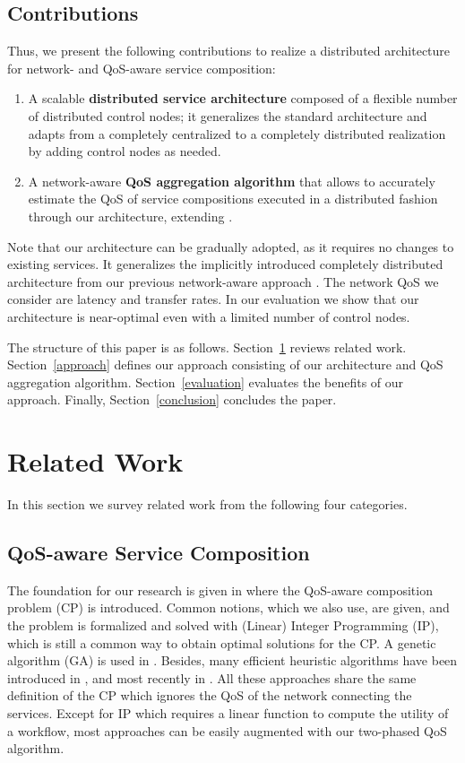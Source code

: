 \documentclass[10pt, conference, compsocconf]{IEEEtran}
\begin{document}
\subsection{Contributions}
\noindent Thus, we present the following contributions to realize a distributed architecture for network- and QoS-aware service composition:
\begin{enumerate}
	\item A scalable \textbf{distributed service architecture} composed of a flexible number of distributed control nodes;
			it generalizes the standard architecture and 
			adapts from a completely centralized to a completely distributed realization by adding control nodes as needed.
	\item A network-aware \textbf{QoS aggregation algorithm} that allows to accurately estimate the QoS of service compositions
		executed in a distributed fashion through our architecture,	extending \cite{Klein2012}.
\end{enumerate}
Note that our architecture can be gradually adopted, as it requires no changes to existing services.
It generalizes the implicitly introduced completely distributed architecture from our previous network-aware approach \cite{Klein2012}.
The network QoS we consider are latency and transfer rates.
In our evaluation we show that our architecture is near-optimal even with a limited number of control nodes.

The structure of this paper is as follows.
Section~\ref{related} reviews related work.
Section~\ref{approach} defines our approach consisting of our architecture and QoS aggregation algorithm.
Section~\ref{evaluation} evaluates the benefits of our approach.
Finally, Section~\ref{conclusion} concludes the paper.

\section{Related Work}
\label{related}
\noindent In this section we survey related work from the following four categories.

\subsection{QoS-aware Service Composition}
\noindent The foundation for our research is given in \cite{Zeng2003} where the QoS-aware composition problem (CP) is introduced.
Common notions, which we also use, are given, and the problem is formalized and solved with (Linear) Integer Programming (IP),
	which is still a common way to obtain optimal solutions for the CP.
A genetic algorithm (GA) is used in \cite{Canfora2005,Jaeger2007}.
Besides, many efficient heuristic algorithms have been introduced in \cite{Alrifai2009,Lecue2009,Yu2007},
	and most recently in \cite{Alrifai2010,Klein2011,Rosenberg2010}.
All these approaches share the same definition of the CP which ignores the QoS of the network connecting the services.
Except for IP which requires a linear function to compute the utility of a workflow,
	most approaches can be easily augmented with our two-phased QoS algorithm.
\end{document}
